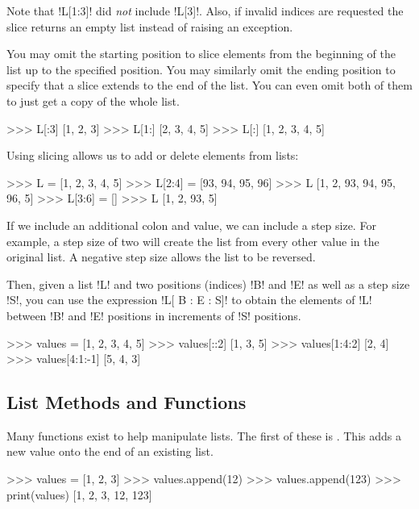 \documentclass[11pt]{cselabheader}
\begin{document}
Note that \pythoninline!L[1:3]! did \emph{not} include \pythoninline!L[3]!.
Also, if invalid indices are requested the slice returns an empty list instead
of raising an exception.

You may omit the starting position to slice elements from the beginning of the
list up to the specified position. You may similarly omit the ending position to
specify that a slice extends to the end of the list. You can even omit both of
them to just get a copy of the whole list.

\begin{pyconcode}
>>> L[:3]
[1, 2, 3]
>>> L[1:]
[2, 3, 4, 5]
>>> L[:]
[1, 2, 3, 4, 5]
\end{pyconcode}

Using slicing allows us to add or delete elements from lists:

\begin{pyconcode}
>>> L = [1, 2, 3, 4, 5]
>>> L[2:4] = [93, 94, 95, 96]
>>> L
[1, 2, 93, 94, 95, 96, 5]
>>> L[3:6] = []
>>> L
[1, 2, 93, 5]
\end{pyconcode}

If we include an additional colon and value, we can include a step size. For
example, a step size of two will create the list from every other value in the
original list. A negative step size allows the list to be reversed.

Then, given a list \pythoninline!L! and two positions (indices) \pythoninline!B! and
\pythoninline!E! as well as a step size \pythoninline!S!, you can use the expression
\pythoninline!L[ B : E : S]! to obtain the elements of \pythoninline!L! between
\pythoninline!B! and \pythoninline!E! positions in increments of \pythoninline!S!
positions.

\begin{pyconcode}
>>> values = [1, 2, 3, 4, 5]
>>> values[::2]
[1, 3, 5]
>>> values[1:4:2]
[2, 4]
>>> values[4:1:-1]
[5, 4, 3]
\end{pyconcode}

\subsection{List Methods and Functions}
Many functions exist to help manipulate lists. The first of these is
. This adds a new value onto the end of an existing list.

\begin{pyconcode}
>>> values = [1, 2, 3]
>>> values.append(12)
>>> values.append(123)
>>> print(values)
[1, 2, 3, 12, 123]
\end{pyconcode}
\end{document}
